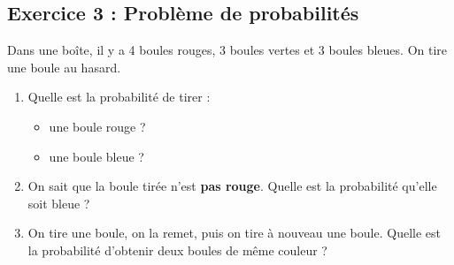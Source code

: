 \documentclass[12pt,a4paper]{article}
\begin{document}
\subsection*{Exercice 3 : Probl\`eme de probabilit\'es}

Dans une bo\^ite, il y a 4 boules rouges, 3 boules vertes et 3 boules bleues. On tire une boule au hasard.

\begin{enumerate}
    \item Quelle est la probabilit\'e de tirer :
    \begin{itemize}
        \item une boule rouge ?
        \item une boule bleue ?
    \end{itemize}
    \item On sait que la boule tir\'ee n'est \textbf{pas rouge}. Quelle est la probabilit\'e qu'elle soit bleue ?
    \item On tire une boule, on la remet, puis on tire \`a nouveau une boule. Quelle est la probabilit\'e d'obtenir deux boules de m\^eme couleur ?
\end{enumerate}

\vspace{0.5cm}
\begin{tcolorbox}[colframe=black, colback=white, width=\linewidth]
\vspace{6cm}
\end{tcolorbox}
\end{document}
